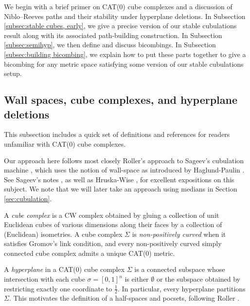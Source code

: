 \documentclass{amsart}
\theoremstyle{definition}
\theoremstyle{remark}
\theoremstyle{definition}
\begin{document}
We begin with a brief primer on CAT(0) cube complexes and a discussion of Niblo--Reeves paths and their stability under hyperplane deletions.  In Subsection \ref{subsec:stable cubes, early}, we give a precise version of our stable cubulations result along with its associated path-building construction.  In Subsection \ref{subsec:semihyp}, we then define and discuss bicombings.  In Subsection \ref{subsec:building bicombing}, we explain how to put these parts together to give a bicombing for any metric space satisfying some version of our stable cubulations setup.

\subsection{Wall spaces, cube complexes, and hyperplane deletions}\label{subsec:CCC background}



This subsection includes a quick set of definitions and references for readers unfamiliar with CAT(0) cube complexes.

Our approach here follows most closely Roller's approach \cite{Roller} to Sageev's cubulation machine \cite{Sageev:cubulation}, which uses the notion of wall-space as introduced by Haglund-Paulin \cite{HP_wallspace}.  See Sageev's notes \cite{Sageev:pcmi}, as well as Hruska-Wise \cite{HW_CCC}, for excellent expositions on this subject.  We note that we will later take an approach using medians in Section \ref{sec:cubulation}.  

A \emph{cube complex} is a CW complex obtained by gluing a collection of unit Euclidean cubes of various dimensions along their faces by a collection of (Euclidean) isometries.  A cube complex $\Sigma$ is \emph{non-positively curved} when it satisfies Gromov's link condition, and every non-positively curved simply connected cube complex admits a unique CAT(0) metric.

A \emph{hyperplane} in a CAT(0) cube complex $\Sigma$ is a connected subspace whose intersection with each cube $\sigma = [0,1]^{n}$ is either $\emptyset$ or the subspace obtained by restricting exactly one coordinate to $\frac{1}{2}$.  In particular, every hyperplane partitions $\Sigma$.  This motivates the definition of a half-spaces and pocsets, following Roller \cite{Roller}.
\end{document}
